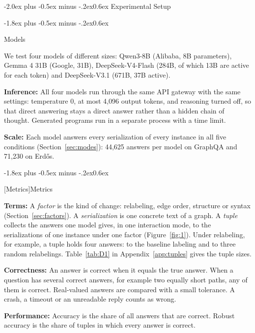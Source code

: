 \documentclass[11pt]{article}
\makeatletter
\renewcommand\section{\@startsection{section}{1}{\z@}
  {-2.0ex plus -0.5ex minus -.2ex}{0.6ex}
  {\large\bfseries\centering}}
\renewcommand\subsection{\@startsection{subsection}{2}{\z@}
  {-1.8ex plus -0.5ex minus -.2ex}{0.6ex}
  {\normalsize\bfseries\raggedright}}
\makeatother
\begin{document}
\section{Experimental Setup}

\subsection{Models}

We test four models of different sizes: Qwen3-8B (Alibaba, 8B parameters), Gemma 4 31B (Google, 31B), DeepSeek-V4-Flash (284B, of which 13B are active for each token) and DeepSeek-V3.1 (671B, 37B active).

\textbf{Inference:} All four models run through the same API gateway with the same settings: temperature 0, at most 4,096 output tokens, and reasoning turned off, so that direct answering stays a direct answer rather than a hidden chain of thought. Generated programs run in a separate process with a time limit.

\textbf{Scale:} Each model answers every serialization of every instance in all five conditions (Section~\ref{sec:modes}): 44,625 answers per model on GraphQA and 71,230 on Erdős.

\subsection[Metrics]{Metrics}\label{sec:metrics}

\textbf{Terms:} A \emph{factor} is the kind of change: relabeling, edge order, structure or syntax (Section~\ref{sec:factors}). A \emph{serialization} is one concrete text of a graph. A \emph{tuple} collects the answers one model gives, in one interaction mode, to the serializations of one instance under one factor (Figure~\ref{fig:1}). Under relabeling, for example, a tuple holds four answers: to the baseline labeling and to three random relabelings. Table~\ref{tab:D1} in Appendix~\ref{app:tuples} gives the tuple sizes.

\textbf{Correctness:} An answer is correct when it equals the true answer. When a question has several correct answers, for example two equally short paths, any of them is correct. Real-valued answers are compared with a small tolerance. A crash, a timeout or an unreadable reply counts as wrong.

\textbf{Performance:} Accuracy is the share of all answers that are correct. Robust accuracy is the share of tuples in which every answer is correct.
\end{document}

